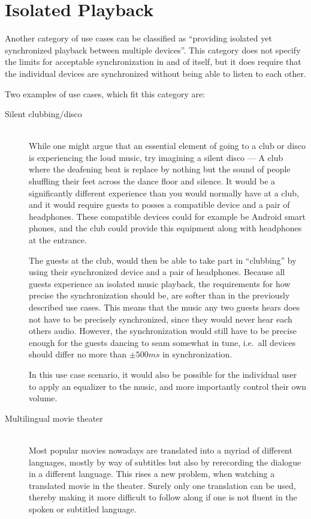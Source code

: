 \section{Isolated Playback}
Another category of use cases can be classified as \enquote{providing isolated yet synchronized playback between multiple devices}.
This category does not specify the limits for acceptable synchronization in and of itself, but it does require that the individual devices are synchronized without being able to listen to each other.

Two examples of use cases, which fit this category are:
\begin{description}
    \item[Silent clubbing/disco] \hfill\\
        While one might argue that an essential element of going to a club or disco is experiencing the loud music, try imagining a silent disco ---
        A club where the deafening beat is replace by nothing but the sound of people shuffling their feet across the dance floor and silence.
        It would be a significantly different experience than you would normally have at a club, and it would require guests to posses a compatible device and a pair of headphones.
        These compatible devices could for example be Android smart phones, and the club could provide this equipment along with headphones at the entrance.

        The guests at the club, would then be able to take part in \enquote{clubbing} by using their synchronized device and a pair of headphones.
        Because all guests experience an isolated music playback, the requirements for how precise the synchronization should be, are softer than in the previously described use cases.
        This means that the music any two guests hears does not have to be precisely synchronized, since they would never hear each others audio.
        However, the synchronization would still have to be precise enough for the guests dancing to seam somewhat in tune, i.e.~all devices should differ no more than $\pm 500 ms$ in synchronization.

        In this use case scenario, it would also be possible for the individual user to apply an equalizer to the music, and more importantly control their own volume.
    \item[Multilingual movie theater] \hfill\\
        Most popular movies nowadays are translated into a myriad of different languages, mostly by way of subtitles but also by rerecording the dialogue in a different language.
        This rises a new problem, when watching a translated movie in the theater.
        Surely only one translation can be used, thereby making it more difficult to follow along if one is not fluent in the spoken or subtitled language.


\end{description}
